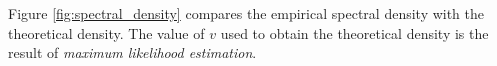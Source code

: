 \documentclass{article}
\begin{document}
\pagebreak
Figure \ref{fig:spectral_density} compares the empirical spectral
density with the theoretical density. The value of $v$ used to obtain
the theoretical density is the result of {\it maximum likelihood
  estimation}.
\begin{figure}[htb!]
  \centering
  \subfigure[q = 0.65, v=0.8409, KL = 0.15]{
}
\end{figure}
\end{document}
